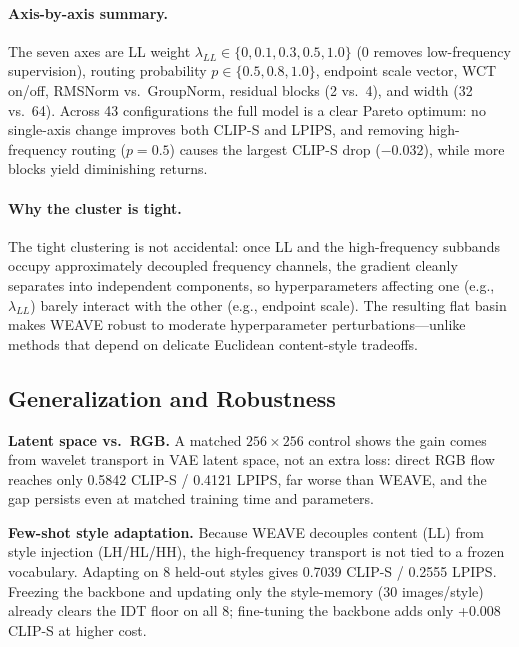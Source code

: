 \documentclass[letterpaper]{article}
\begin{document}
\paragraph{Axis-by-axis summary.}
The seven axes are LL weight $\lambda_{LL}\in\{0,0.1,0.3,0.5,1.0\}$ (0 removes low-frequency supervision), routing probability $p\in\{0.5,0.8,1.0\}$, endpoint scale vector, WCT on/off, RMSNorm vs.\ GroupNorm, residual blocks (2 vs.\ 4), and width (32 vs.\ 64).
Across 43 configurations the full model is a clear Pareto optimum: no single-axis change improves both CLIP-S and LPIPS, and removing high-frequency routing ($p{=}0.5$) causes the largest CLIP-S drop ($-0.032$), while more blocks yield diminishing returns.

\paragraph{Why the cluster is tight.}
The tight clustering is not accidental: once LL and the high-frequency subbands occupy approximately decoupled frequency channels, the gradient cleanly separates into independent components, so hyperparameters affecting one (e.g., $\lambda_{LL}$) barely interact with the other (e.g., endpoint scale).
The resulting flat basin makes WEAVE robust to moderate hyperparameter perturbations---unlike methods that depend on delicate Euclidean content-style tradeoffs.









\subsection{Generalization and Robustness}
\label{sec:gen}

\textbf{Latent space vs.\ RGB.}
A matched $256{\times}256$ control shows the gain comes from wavelet transport in VAE latent space, not an extra loss: direct RGB flow reaches only 0.5842 CLIP-S / 0.4121 LPIPS, far worse than WEAVE, and the gap persists even at matched training time and parameters.

\textbf{Few-shot style adaptation.}
Because WEAVE decouples content (LL) from style injection (LH/HL/HH), the high-frequency transport is not tied to a frozen vocabulary.
Adapting on 8 held-out styles gives 0.7039 CLIP-S / 0.2555 LPIPS.
Freezing the backbone and updating only the style-memory (30 images/style) already clears the IDT floor on all 8; fine-tuning the backbone adds only +0.008 CLIP-S at higher cost.
\end{document}
